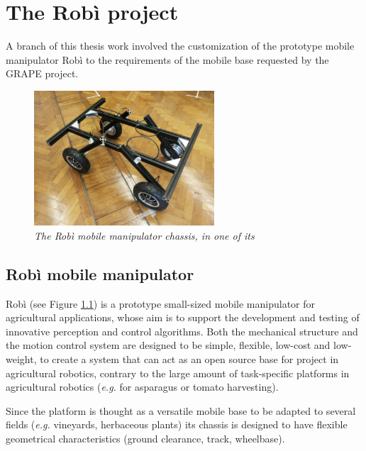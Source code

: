 
\chapter{The Robì project} \label{chap:robìProject}

A branch of this thesis work involved the customization of the prototype mobile manipulator Robì \parencite{robi} to the requirements of the mobile base requested by the \ac{GRAPE} project. 


\begin{figure}
	\centering
	\includegraphics[width=0.6\textwidth]{Images/robi/robi_inizio.png}
	\caption{\textit{The Robì mobile manipulator chassis, in one of its}}
	\label{fig:robiDefault}
\end{figure}


\section{Robì mobile manipulator}
Robì (see Figure \ref{fig:robiDefault}) is a prototype small-sized mobile manipulator for agricultural applications, whose aim is to support the development and testing of innovative perception and control algorithms. Both the mechanical structure and the motion control system are designed to be simple, flexible, low-cost and low-weight, to create a system that can act as an open source base for project in agricultural robotics, contrary to the large amount of task-specific platforms in agricultural robotics (\textit{e.g.} for asparagus \parencite{asparagi} or tomato \parencite{pomodori} harvesting).

\par Since the platform is thought as a versatile mobile base to be adapted to several fields (\textit{e.g.} vineyards, herbaceous plants) its chassis is designed to have flexible geometrical characteristics (ground clearance, track, wheelbase).

